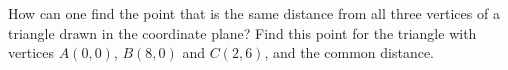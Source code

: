 How can one find the point that is the same distance from all three vertices of a triangle drawn in the coordinate plane? Find this point for the triangle with vertices $A(0,0)$, $B(8,0)$ and $C(2,6)$, and the common distance.
